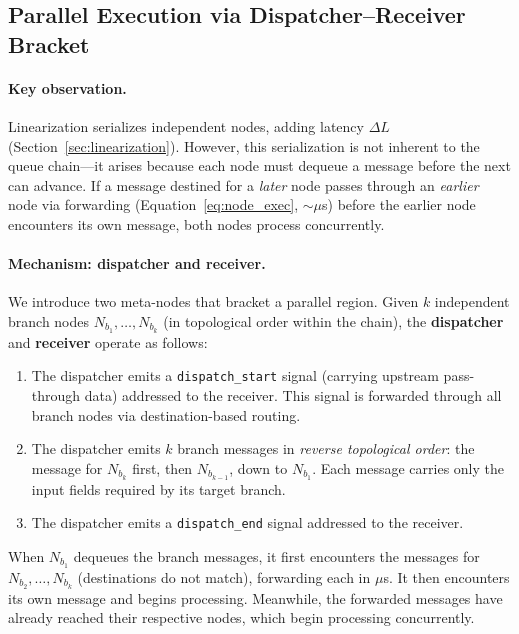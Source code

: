 \documentclass[11pt,a4paper]{article}
\begin{document}
\subsection{Parallel Execution via Dispatcher--Receiver Bracket}
\label{sec:parallel}

\paragraph{Key observation.}
Linearization serializes independent nodes, adding latency $\Delta L$ (Section~\ref{sec:linearization}). However, this serialization is not inherent to the queue chain---it arises because each node must dequeue a message before the next can advance. If a message destined for a \emph{later} node passes through an \emph{earlier} node via forwarding (Equation~\ref{eq:node_exec}, $\sim$$\mu$s) before the earlier node encounters its own message, both nodes process concurrently.

\paragraph{Mechanism: dispatcher and receiver.}
We introduce two meta-nodes that bracket a parallel region. Given $k$ independent branch nodes $N_{b_1}, \ldots, N_{b_k}$ (in topological order within the chain), the \textbf{dispatcher} and \textbf{receiver} operate as follows:

\begin{enumerate}[nosep]
    \item The dispatcher emits a \texttt{dispatch\_start} signal (carrying upstream pass-through data) addressed to the receiver. This signal is forwarded through all branch nodes via destination-based routing.
    \item The dispatcher emits $k$ branch messages in \emph{reverse topological order}: the message for $N_{b_k}$ first, then $N_{b_{k-1}}$, down to $N_{b_1}$. Each message carries only the input fields required by its target branch.
    \item The dispatcher emits a \texttt{dispatch\_end} signal addressed to the receiver.
\end{enumerate}

When $N_{b_1}$ dequeues the branch messages, it first encounters the messages for $N_{b_2}, \ldots, N_{b_k}$ (destinations do not match), forwarding each in $\mu$s. It then encounters its own message and begins processing. Meanwhile, the forwarded messages have already reached their respective nodes, which begin processing concurrently.
\end{document}
